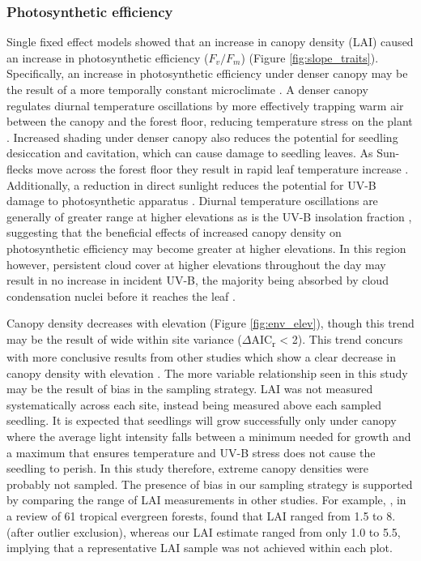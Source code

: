 \documentclass[a4paper, 11pt]{article}
\begin{document}
\subsubsection*{Photosynthetic efficiency}
Single fixed effect models showed that an increase in canopy density (LAI) caused an increase in photosynthetic efficiency ($F_v/F_m$) (Figure \ref{fig:slope_traits}). Specifically, an increase in photosynthetic efficiency under denser canopy may be the result of a more temporally constant microclimate \citep{Amissah2015}. A denser canopy regulates diurnal temperature oscillations by more effectively trapping warm air between the canopy and the forest floor, reducing temperature stress on the plant \citep{Larcher2003}. Increased shading under denser canopy also reduces the potential for seedling desiccation and cavitation, which can cause damage to seedling leaves. As Sun-flecks move across the forest floor they result in rapid leaf temperature increase \citep{Rozendaal2006, Poorter2010}. Additionally, a reduction in direct sunlight reduces the potential for UV-B damage to photosynthetic apparatus \citep{Dobrikova2013}. Diurnal temperature oscillations are generally of greater range at higher elevations \citep{Seidel2005} as is the UV-B insolation fraction \citep{Piazena1996}, suggesting that the beneficial effects of increased canopy density on photosynthetic efficiency may become greater at higher elevations. In this region however, persistent cloud cover at higher elevations throughout the day may result in no increase in incident UV-B, the majority being absorbed by cloud condensation nuclei before it reaches the leaf \citep{Flint2003}.

Canopy density decreases with elevation (Figure \ref{fig:env_elev}), though this trend may be the result of wide within site variance ($\Delta$AIC\textsubscript{r} < 2). This trend concurs with more conclusive results from other studies which show a clear decrease in canopy density with elevation \citep{Kitayama2002, Moser2008}. The more variable relationship seen in this study may be the result of bias in the sampling strategy. LAI was not measured systematically across each site, instead being measured above each sampled seedling. It is expected that seedlings will grow successfully only under canopy where the average light intensity falls between a minimum needed for growth and a maximum that ensures temperature and UV-B stress does not cause the seedling to perish. In this study therefore, extreme canopy densities were probably not sampled. The presence of bias in our sampling strategy is supported by comparing the range of LAI measurements in other studies. For example, \citet{Asner2003}, in a review of 61 tropical evergreen forests, found that LAI ranged from 1.5 to 8. (after outlier exclusion), whereas our LAI estimate ranged from only 1.0 to 5.5, implying that a representative LAI sample was not achieved within each plot.
\end{document}
